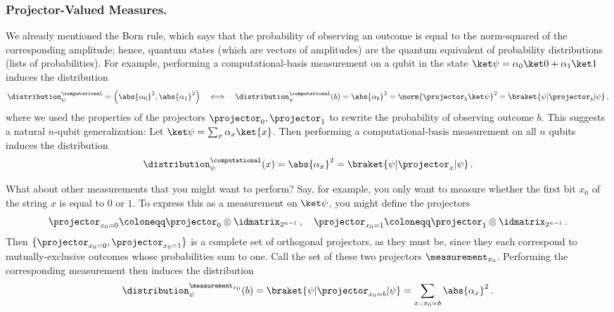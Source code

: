     \subsubsection{Projector-Valued Measures.}
      We already mentioned the Born rule, which says that the probability of
        observing an outcome is equal to the norm-squared of the corresponding
        amplitude; hence, quantum states (which are vectors of amplitudes) are the quantum
        equivalent of probability distributions (lists of probabilities). 
        For example, performing a computational-basis measurement on a qubit in
        the state $\ket\psi = \alpha_0 \ket0 + \alpha_1 \ket1$ induces the
        distribution
        \[
          \distribution_\psi^{\computational} 
          = \left(\abs{\alpha_0}^2, \abs{\alpha_1}^2\right)
          \quad\Longleftrightarrow\quad \distribution_\psi^{\computational}(b) 
          = \abs{\alpha_b}^2 = \norm{\projector_b \ket\psi}^2 
          = \braket{\psi|\projector_b|\psi}\, ,
        \]
      where we used the properties of the projectors $\projector_0,
      \projector_1$ to rewrite the probability of observing outcome $b$.
      This suggests a natural $n$-qubit generalization: 
      Let $\ket\psi = \sum_x \alpha_x \ket{x}$. Then performing a
      computational-basis measurement on all $n$ qubits induces the distribution
      \[
        \distribution_\psi^{\computational}(x) 
        = \abs{\alpha_x}^2 = \braket{\psi|\projector_x|\psi}\, .
      \]

      What about other measurements that you might want to perform? 
        Say, for example, you only want to measure whether the first bit $x_0$ of
        the string $x$ is equal to $0$ or $1$. To express this as a measurement on
        $\ket\psi$, you might define the projectors
      \[
        \projector_{x_0 = 0} \coloneqq \projector_0 \otimes \idmatrix_{2^{n-1}}\, ,
        \quad
        \projector_{x_0 = 1} \coloneqq \projector_1 \otimes \idmatrix_{2^{n-1}}\, .
      \]
      Then $\{\projector_{x_0 = 0}, \projector_{x_0 = 1}\}$ is a complete set of
        orthogonal projectors, as they must be, since they each correspond to
        mutually-exclusive outcomes whose probabilities sum to one. 
        Call the set of these two projectors $\measurement_{x_0}$. 
        Performing the corresponding measurement then induces the distribution
      \[
        \distribution_\psi^{\measurement_{x_0}}(b) 
        = \braket{\psi|\projector_{x_0 = b}|\psi}
        = \sum_{x\, :\, x_0 = b} \abs{\alpha_x}^2\, .
      \]


